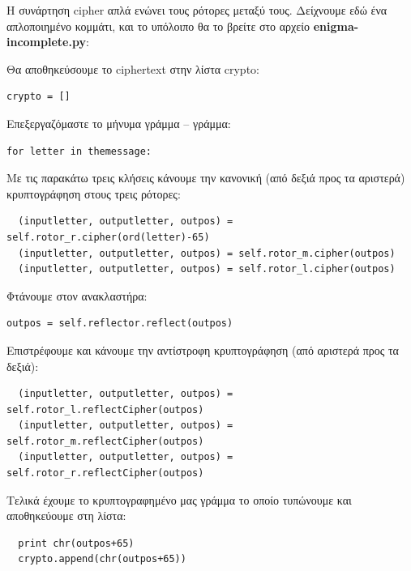 \documentclass[a4paper,twoside,12pt]{article}
\begin{document}
Η συνάρτηση cipher απλά ενώνει τους ρότορες μεταξύ τους. Δείχνουμε εδώ ένα απλοποιημένο κομμάτι, και το υπόλοιπο θα το βρείτε στο αρχείο \textbf{enigma-incomplete.py}:

Θα αποθηκεύσουμε το ciphertext στην λίστα crypto:

\begin{verbatim}
crypto = []
\end{verbatim}

Επεξεργαζόμαστε το μήνυμα γράμμα – γράμμα:

\begin{verbatim}
for letter in themessage:
\end{verbatim}

Με τις παρακάτω τρεις κλήσεις κάνουμε την κανονική (από δεξιά προς τα αριστερά) κρυπτογράφηση στους τρεις ρότορες:

\footnotesize
\begin{verbatim}
  (inputletter, outputletter, outpos) = self.rotor_r.cipher(ord(letter)-65)
  (inputletter, outputletter, outpos) = self.rotor_m.cipher(outpos)
  (inputletter, outputletter, outpos) = self.rotor_l.cipher(outpos)
\end{verbatim}
\normalsize

Φτάνουμε στον ανακλαστήρα:

\begin{verbatim}
outpos = self.reflector.reflect(outpos)
\end{verbatim}

Επιστρέφουμε και κάνουμε την αντίστροφη κρυπτογράφηση (από αριστερά προς τα δεξιά):

\footnotesize
\begin{verbatim}
  (inputletter, outputletter, outpos) = self.rotor_l.reflectCipher(outpos)
  (inputletter, outputletter, outpos) = self.rotor_m.reflectCipher(outpos)
  (inputletter, outputletter, outpos) = self.rotor_r.reflectCipher(outpos)
\end{verbatim}
\normalsize

Τελικά έχουμε το κρυπτογραφημένο μας γράμμα το οποίο τυπώνουμε και αποθηκεύουμε στη λίστα:

\begin{verbatim}
  print chr(outpos+65)
  crypto.append(chr(outpos+65))
\end{verbatim}
\end{document}
